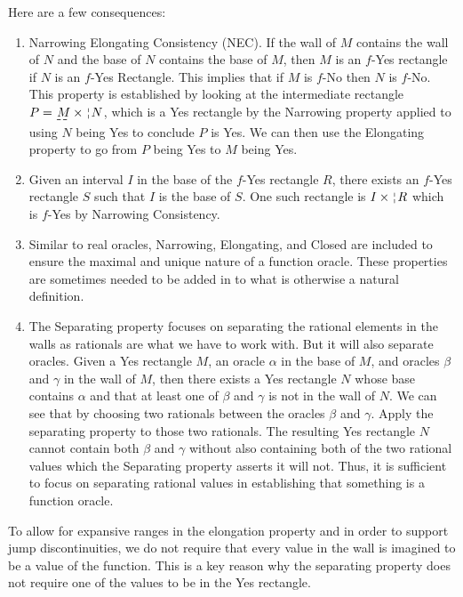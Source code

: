 \documentclass[12pt]{article}
\begin{document}
Here are a few consequences: 

\begin{enumerate}
    \item Narrowing Elongating Consistency (NEC). If the wall of $M$ contains the wall of $N$ and the base of $N$ contains the base of $M$, then $M$ is an $f$-Yes rectangle if $N$  is an $f$-Yes Rectangle. This implies that if $M$ is $f$-No then $N$ is $f$-No. This property is established by looking at the intermediate rectangle $P = \base{M} \times \wall{N}$, which is a Yes rectangle by the Narrowing property applied to using $N$ being Yes to conclude $P$ is Yes. We can then use the Elongating property to go from $P$ being Yes to $M$ being Yes. 

    \item Given an interval $I$ in the base of the $f$-Yes rectangle $R$, there exists an $f$-Yes rectangle $S$ such that $I$ is the base of $S$. One such rectangle is $I \times \wall{R}$ which is $f$-Yes by Narrowing Consistency. 

    \item Similar to real oracles, Narrowing, Elongating, and Closed are included to ensure the maximal and unique nature of a function oracle. These properties are sometimes needed to be added in to what is otherwise a natural definition. 

    \item The Separating property focuses on separating the rational elements in the walls as rationals are what we have to work with. But it will also separate oracles. Given a Yes rectangle $M$, an oracle $\alpha$ in the base of $M$, and oracles $\beta$ and $\gamma$ in the wall of $M$, then there exists a Yes rectangle $N$ whose base contains $\alpha$ and that at least one of $\beta$ and $\gamma$ is not in the wall of $N$. We can see that by choosing two rationals between the oracles $\beta$ and $\gamma$. Apply the separating property to those two rationals. The resulting Yes rectangle $N$ cannot contain both $\beta$ and $\gamma$ without also containing both of the two rational values which the Separating property asserts it will not. Thus, it is sufficient to focus on separating rational values in establishing that something is a function oracle. 

\end{enumerate}

To allow for expansive ranges in the elongation property and in order to support jump discontinuities, we do not require that every value in the wall is imagined to be a value of the function. This is a key reason why the separating property does not require one of the values to be in the Yes rectangle. 
\end{document}

